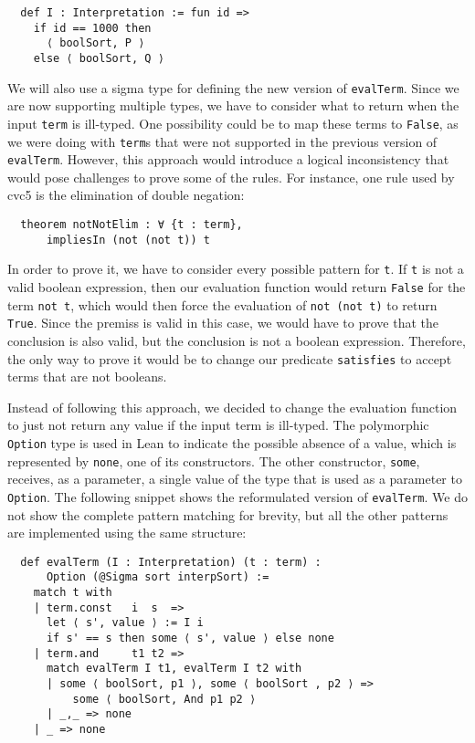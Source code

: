 \begin{verbatim}
  def I : Interpretation := fun id =>
    if id == 1000 then
      ⟨ boolSort, P ⟩
    else ⟨ boolSort, Q ⟩
\end{verbatim}

We will also use a sigma type for defining the new version of \texttt{evalTerm}.
%
Since we are now supporting multiple types, we have to consider what to return
when the input \texttt{term} is ill-typed. One possibility could be to map these
terms to \texttt{False}, as we were doing with \texttt{term}s that were not supported
in the previous version of \texttt{evalTerm}. However, this approach would introduce
a logical inconsistency that would pose challenges to prove some of the rules.
For instance, one rule used by cvc5 is the elimination of double negation:

\begin{verbatim}
  theorem notNotElim : ∀ {t : term},
      impliesIn (not (not t)) t
\end{verbatim}

In order to prove it, we have to consider every possible pattern for \texttt{t}.
If \texttt{t} is not a valid boolean expression, then our evaluation function would
return \texttt{False} for the term \texttt{not t}, which would then force the
evaluation of \texttt{not (not t)} to return \texttt{True}. Since the premiss
is valid in this case, we would have to prove that the conclusion is also valid,
but the conclusion is not a boolean expression. Therefore, the only way to prove it
would be to change our predicate \texttt{satisfies} to accept terms that are not booleans.

Instead of following this approach, we decided to change the evaluation function to just not return
any value if the input term is ill-typed. The polymorphic \texttt{Option} type is used in Lean to
indicate the possible absence of a value, which is represented by \texttt{none}, one of its
constructors. The other constructor, \texttt{some}, receives, as a parameter, a single value
of the type that is used as a parameter to \texttt{Option}.
%
The following snippet shows the reformulated version of \texttt{evalTerm}.
We do not show the complete pattern matching for brevity, but all the other
patterns are implemented using the same structure:

\begin{verbatim}
  def evalTerm (I : Interpretation) (t : term) :
      Option (@Sigma sort interpSort) :=
    match t with
    | term.const   i  s  =>
      let ⟨ s', value ⟩ := I i
      if s' == s then some ⟨ s', value ⟩ else none
    | term.and     t1 t2 =>
      match evalTerm I t1, evalTerm I t2 with
      | some ⟨ boolSort, p1 ⟩, some ⟨ boolSort , p2 ⟩ =>
          some ⟨ boolSort, And p1 p2 ⟩
      | _,_ => none
    | _ => none
\end{verbatim}

